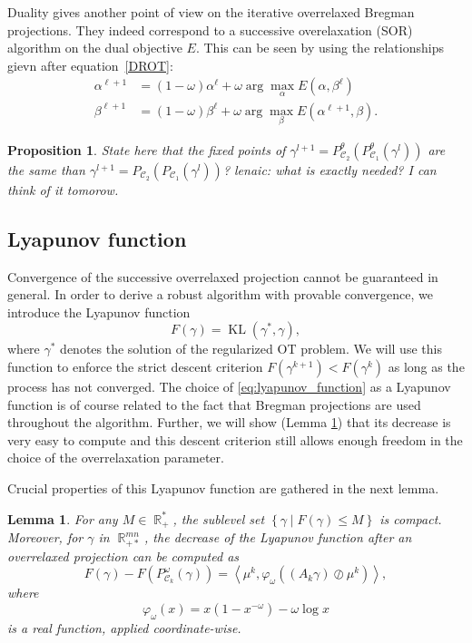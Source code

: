 \documentclass{article} %
\newcommand{\scal}[2]{\left\langle #1 , #2 \right\rangle}
\DeclareMathOperator{\IR}{\mathbb{R}}
\DeclareMathOperator{\Ccal}{\mathcal{C}}
\DeclareMathOperator{\KL}{KL}
\theoremstyle{plain}
\newtheorem{proposition}{Proposition}
\newtheorem{lemma}{Lemma}
\theoremstyle{definition}
\theoremstyle{remark}
\begin{document}
Duality gives another point of view on the iterative overrelaxed Bregman projections. They indeed correspond to a successive overelaxation (SOR) algorithm on the dual objective $E$. This can be seen by using the relationships gievn after equation~\eqref{DROT}:
\begin{align}\label{SORdual}
\alpha^{\ell+1} &= (1-\omega)\alpha^{\ell} + \omega \arg \max_\alpha E(\alpha,\beta^{\ell})\\
\beta^{\ell + 1}&=(1-\omega) \beta^{\ell} + \omega \arg \max_\beta E(\alpha^{\ell+1},\beta).
\end{align} 

{\color{blue} \begin{proposition} 
State here that the fixed points of   $\gamma^{l+1} =P^\theta_{\Ccal_2}(P^\theta_{\Ccal_1}(\gamma^l))$ are the same than $\gamma^{l+1} =P_{\Ccal_2}(P_{\Ccal_1}(\gamma^l))$? lenaic: what is exactly needed? I can think of it tomorow.
\end{proposition}}
\subsection{Lyapunov function}
Convergence of the successive overrelaxed projection cannot be guaranteed in general. In order to derive a robust algorithm with provable convergence, we introduce the Lyapunov function 
\begin{equation}\label{eq:lyapunov_function}
F(\gamma) = \KL(\gamma^*, \gamma),
\end{equation}
where $\gamma^*$ denotes the solution of the regularized OT problem. We will use this function to enforce the strict descent criterion $F(\gamma^{k+1}) < F(\gamma^k)$ as long as the process has not converged.
%
The choice of \eqref{eq:lyapunov_function} as a Lyapunov function is of course related to the fact that Bregman projections are used throughout the algorithm. Further, we will show (Lemma \ref{lemma:lyapunov_decrease}) that its decrease is very easy to compute and this descent criterion still allows enough freedom in the choice of the overrelaxation parameter.

Crucial properties of this Lyapunov function are gathered in the next lemma.
\begin{lemma} \label{lemma:lyapunov_decrease}
	For any $M \in \IR_+^*$, the sublevel set $\left\{ \gamma \mid F(\gamma) \le M \right\}$ is compact.
	Moreover, for $\gamma$ in $\IR^{mn}_{+*}$, the decrease of the Lyapunov function after an overrelaxed projection can be computed as
	\begin{equation} \label{eq:kl_diff_scal}
	F(\gamma) - F(P^\omega_{\Ccal_k}(\gamma)) = 
	\scal{\mu^k}{\varphi_\omega \left((A_k \gamma) \oslash \mu^k \right)},
	\end{equation}
	where
	\begin{equation}
	\varphi_\omega(x) = x(1-x^{-\omega}) - \omega \log x
	\end{equation}
	is a real function, applied coordinate-wise.
\end{lemma}
\end{document}
